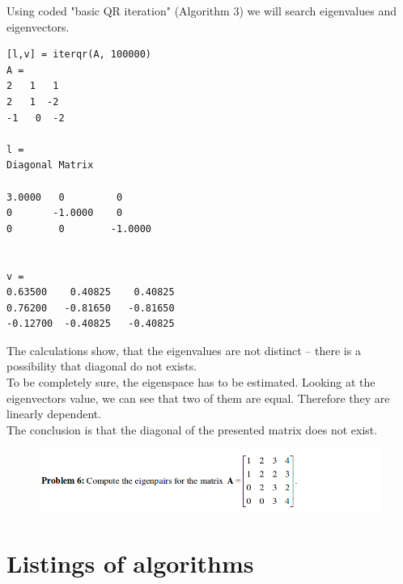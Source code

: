 \documentclass[eng,openany]{mgr}
\begin{document}
Using coded "basic QR iteration" (Algorithm 3) we will search eigenvalues and eigenvectors.

\begin{lstlisting}
[l,v] = iterqr(A, 100000)
A =
2   1   1
2   1  -2
-1   0  -2

l =
Diagonal Matrix

3.0000	 0         0
0		-1.0000    0
0        0        -1.0000


v =
0.63500    0.40825    0.40825 
0.76200   -0.81650   -0.81650 
-0.12700  -0.40825   -0.40825
\end{lstlisting}

The calculations show, that the eigenvalues are not distinct -- there is a possibility that diagonal do not exists.\\
To be completely sure, the eigenspace has to be estimated.
Looking at the eigenvectors value, we can see that two of them are equal. Therefore they are linearly dependent.
\\

The conclusion is that the diagonal of the presented matrix does not exist.
\newpage
\begin{figure}[h]
\centering
\includegraphics[width=0.8\linewidth]{screenshot007}
\label{fig:screenshot007}
\end{figure}


\chapter{Listings of algorithms}
\end{document}
